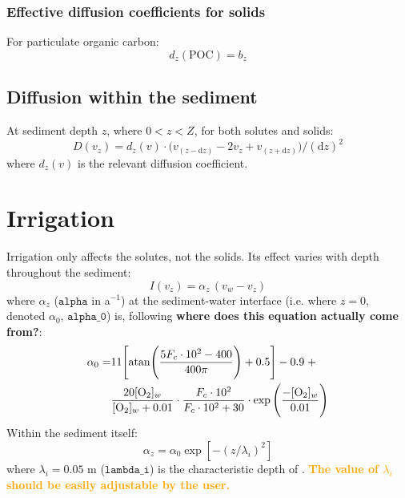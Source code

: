 \documentclass[a4paper]{article}
\newcommand{\D}[1]{\mathrm{d}#1}
\newcommand{\code}[1]{\texttt{#1}}
\newcommand{\wtf}[1]{\textcolor{Cerulean}{\textbf{#1}}}
\newcommand{\codenote}[1]{\textcolor{Orange}{\textbf{#1}}}
\begin{document}
\subsubsection{Effective diffusion coefficients for solids}

For particulate organic carbon:
\begin{equation}
d_z(\mathrm{POC}) = b_z
\end{equation}


\subsection{Diffusion within the sediment}

At sediment depth $z$, where $0 < z < Z$, for both solutes and solids:
\begin{equation}\label{eq:diffusion}
D(v_z) = d_z(v) \cdot \big( v_{(z-\D{z})} - 2 v_z + v_{(z+\D{z})} \big) / (\D{z})^2
\end{equation}
where $d_z(v)$ is the relevant diffusion coefficient.



\section{Irrigation}\label{sx:irrigation}

Irrigation only affects the solutes, not the solids. Its effect varies with depth throughout the sediment:
\begin{equation}
I(v_z) = \alpha_z \, (v_w - v_z)
\end{equation}
where $\alpha_z$ ($\code{alpha}$ in a$^{-1}$) at the sediment-water interface (i.e. where $z = 0$, denoted $\alpha_0$, $\code{alpha\_0}$) is, following \wtf{where does this equation actually come from?}:
\begin{equation}
\begin{split}
\alpha_0 = & 11 \Bigg[ \mathrm{atan} \Bigg( \frac{5 F_c \cdot 10^2 - 400}{400 \pi} \Bigg) + 0.5 \Bigg] - 0.9 \; + \\
& \frac{20 [\ce{O2}]_w}{[\ce{O2}]_w + 0.01} \cdot \frac{F_c \cdot 10^2}{F_c \cdot 10^2 + 30} \cdot \exp \Bigg(\frac{-[\ce{O2}]_w}{0.01}\Bigg)
\end{split}
\end{equation}
Within the sediment itself:
\begin{equation}
\alpha_z = \alpha_0 \exp [-(z/\lambda_i)^2]
\end{equation}
where $\lambda_i = 0.05$ m ($\code{lambda\_i}$) is the characteristic depth of \citet{archer_model_2002}. \codenote{The value of $\lambda_i$ should be easily adjustable by the user.}



\end{document}
